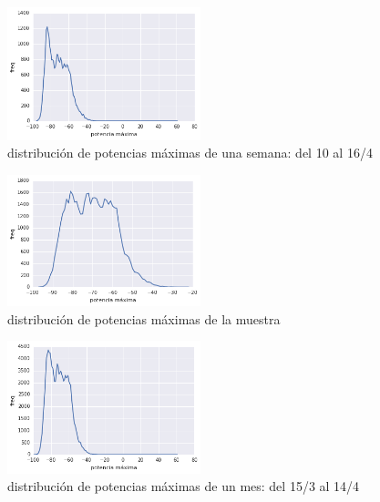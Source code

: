 \begin{figure}[H] 
  \centering
  \includegraphics[width=0.5\textwidth]{pot_max_2016-04-10_al_16.png}
  \caption{distribución de potencias máximas de una semana: del 10 al 16/4}
  \label{fig:pot_max_semana}
\end{figure}

\begin{figure}[H] 
  \centering
  \includegraphics[width=0.5\textwidth]{pot_max_muestra.png}
  \caption{distribución de potencias máximas de la muestra}
  \label{fig:pot_max_muestra}
\end{figure}

\begin{figure}[H] 
  \centering
  \includegraphics[width=0.5\textwidth]{pot_max_mes.png}
  \caption{distribución de potencias máximas de un mes: del 15/3 al 14/4}
  \label{fig:pot_max_mes}
\end{figure}





